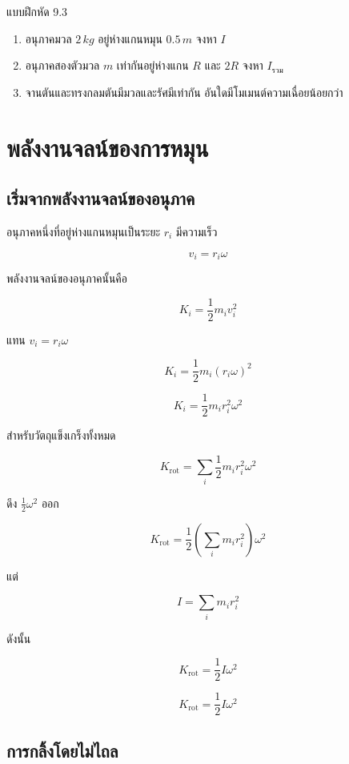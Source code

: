 \begin{exercisebox}{แบบฝึกหัด 9.3}
\begin{enumerate}
    \item อนุภาคมวล $2\,\si{kg}$ อยู่ห่างแกนหมุน $0.5\,\si{m}$ จงหา $I$
    \item อนุภาคสองตัวมวล $m$ เท่ากันอยู่ห่างแกน $R$ และ $2R$ จงหา $I_{\text{รวม}}$
    \item จานตันและทรงกลมตันมีมวลและรัศมีเท่ากัน อันใดมีโมเมนต์ความเฉื่อยน้อยกว่า
\end{enumerate}
\end{exercisebox}

\section{พลังงานจลน์ของการหมุน}

\subsection{เริ่มจากพลังงานจลน์ของอนุภาค}

อนุภาคหนึ่งที่อยู่ห่างแกนหมุนเป็นระยะ $r_i$ มีความเร็ว

\[
v_i=r_i\omega
\]

พลังงานจลน์ของอนุภาคนั้นคือ

\[
K_i=\frac{1}{2}m_i v_i^2
\]

แทน $v_i=r_i\omega$

\[
K_i=\frac{1}{2}m_i(r_i\omega)^2
\]

\[
K_i=\frac{1}{2}m_i r_i^2\omega^2
\]

สำหรับวัตถุแข็งเกร็งทั้งหมด

\[
K_{\text{rot}}=\sum_i \frac{1}{2}m_i r_i^2\omega^2
\]

ดึง $\frac{1}{2}\omega^2$ ออก

\[
K_{\text{rot}}=\frac{1}{2}\left(\sum_i m_i r_i^2\right)\omega^2
\]

แต่

\[
I=\sum_i m_i r_i^2
\]

ดังนั้น

\[
K_{\text{rot}}=\frac{1}{2}I\omega^2
\]

\begin{tcolorbox}[title=พลังงานจลน์ของการหมุน]
\[
K_{\text{rot}}=\frac{1}{2}I\omega^2
\]
\end{tcolorbox}

\subsection{การกลิ้งโดยไม่ไถล}

